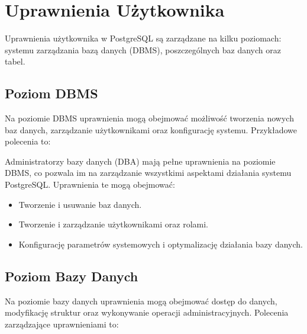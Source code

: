 \documentclass[letterpaper,10pt,polish]{sphinxmanual}
\begin{document}
\sphinxstepscope


\chapter{Uprawnienia Użytkownika}
\label{\detokenize{sprawozdanie/source/rozdzialy/rozdzial2:uprawnienia-uzytkownika}}\label{\detokenize{sprawozdanie/source/rozdzialy/rozdzial2::doc}}
\sphinxAtStartPar
Uprawnienia użytkownika w PostgreSQL są zarządzane na kilku poziomach:
systemu zarządzania bazą danych (DBMS), poszczególnych baz danych oraz
tabel.


\section{Poziom DBMS}
\label{\detokenize{sprawozdanie/source/rozdzialy/rozdzial2:poziom-dbms}}
\sphinxAtStartPar
Na poziomie DBMS uprawnienia mogą obejmować możliwość tworzenia nowych
baz danych, zarządzanie użytkownikami oraz konfigurację systemu.
Przykładowe polecenia to:

\begin{sphinxVerbatim}[commandchars=\\\{\}]
      
      
\end{sphinxVerbatim}

\sphinxAtStartPar
Administratorzy bazy danych (DBA) mają pełne uprawnienia na poziomie
DBMS, co pozwala im na zarządzanie wszystkimi aspektami działania
systemu PostgreSQL. Uprawnienia te mogą obejmować:
\begin{itemize}
\item {} 
\sphinxAtStartPar
Tworzenie i usuwanie baz danych.

\item {} 
\sphinxAtStartPar
Tworzenie i zarządzanie użytkownikami oraz rolami.

\item {} 
\sphinxAtStartPar
Konfigurację parametrów systemowych i optymalizację działania bazy
danych.

\end{itemize}


\section{Poziom Bazy Danych}
\label{\detokenize{sprawozdanie/source/rozdzialy/rozdzial2:poziom-bazy-danych}}
\sphinxAtStartPar
Na poziomie bazy danych uprawnienia mogą obejmować dostęp do danych,
modyfikację struktur oraz wykonywanie operacji administracyjnych.
Polecenia zarządzające uprawnieniami to:
\end{document}
